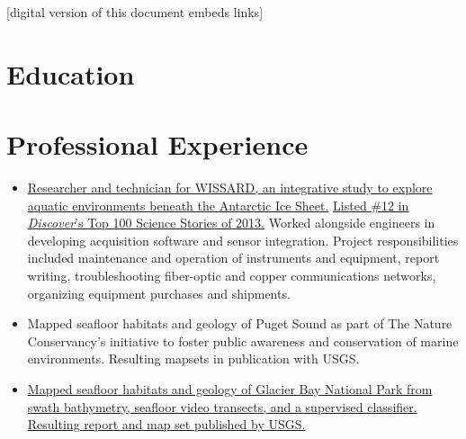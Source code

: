 \documentclass{cv_TOH}
\begin{document}
\vspace{-0.2cm}
\centerline{\footnotesize{[digital version of this document embeds links]}}

\section{Education}

%
\section{Professional Experience}

\begin{itemize}
\item \href{http://www.wissard.org}{Researcher and technician for WISSARD, an
  integrative study to explore aquatic environments beneath the Antarctic Ice
  Sheet.}
  \href{http://discovermagazine.com/2014/jan-feb/12-the-search-for-life-trapped-under-ice}
       {Listed \#12 in \textit{Discover}'s Top 100 Science Stories of 2013.} Worked
       alongside engineers in developing acquisition software and sensor integration.
       Project responsibilities included maintenance and operation of instruments and equipment,
       report writing, troubleshooting fiber-optic and copper communications networks, organizing equipment purchases and shipments.
  
\item Mapped seafloor habitats and geology of Puget Sound as part of The Nature
  Conservancy's initiative to foster public awareness and conservation of marine
  environments. Resulting mapsets in publication with USGS.

\item \href{http://pubs.usgs.gov/sim/3253/}{Mapped seafloor habitats and geology
  of Glacier Bay National Park from swath bathymetry, seafloor video transects, and a supervised classifier. Resulting report and map set published by USGS.}
  
\end{itemize}
\end{document}
